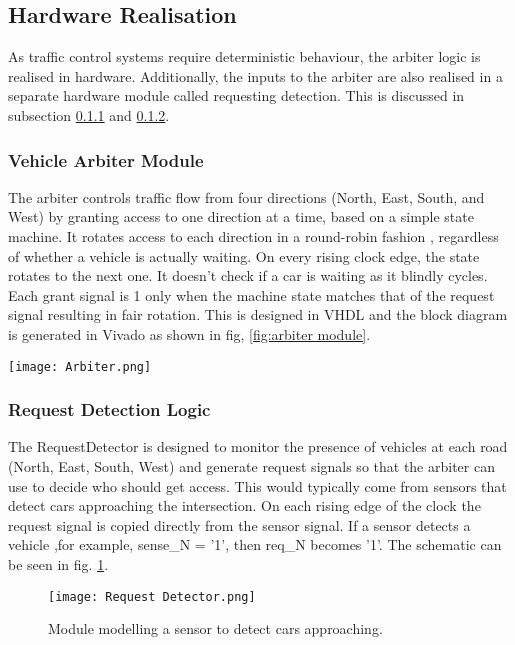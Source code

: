\documentclass[conference]{IEEEtran}
\begin{document}
\subsection{Hardware Realisation}
\label{subsec: hardware}
As traffic control systems require deterministic behaviour, the arbiter logic is realised in hardware. Additionally, the inputs to the arbiter are also realised in a separate hardware module called requesting detection. This is discussed in subsection \ref{subsec:arbiter} and \ref{subsec:reqdetc}.
\subsubsection{Vehicle Arbiter Module}
\label{subsec:arbiter}
The arbiter controls traffic flow from four directions (North, East, South, and West) by granting access to one direction at a time, based on a simple state machine. It rotates access to each direction in a round-robin fashion , regardless of whether a vehicle is actually waiting. On every rising clock edge, the state rotates to the next one. It doesn’t check if a car is waiting as it blindly cycles. Each grant signal is 1 only when the machine state matches that of the request signal resulting in fair rotation. This is designed in VHDL and the block diagram is generated in Vivado as shown in fig, \ref{fig:arbiter module}.

\begin{figure*}
  \centering
  \texttt{[image: Arbiter.png]}
  \caption{Schematic for Arbiter Module}
  \label{fig:arbiter module}
\end{figure*}

\subsubsection{Request Detection Logic}
\label{subsec:reqdetc}
The RequestDetector is designed to monitor the presence of vehicles at each road (North, East, South, West) and generate request signals so that the arbiter can use to decide who should get access. This would typically come from sensors that detect cars approaching the intersection. On each rising edge of the clock the request signal is copied directly from the sensor signal. If a sensor detects a vehicle ,for example, sense\_N = '1', then req\_N becomes '1'. The schematic can be seen in fig. \ref{fig:req}.
\begin{figure}[h!]
    \centering
    \texttt{[image: Request Detector.png]}
    \caption{Module modelling a sensor to detect cars approaching.}
    \label{fig:req}
\end{figure}
\end{document}
